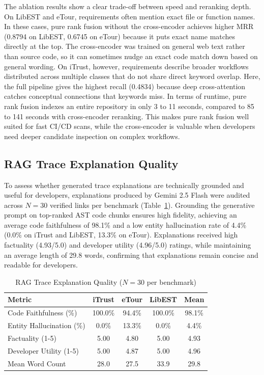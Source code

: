 \documentclass[conference]{IEEEtran}
\renewcommand{\arraystretch}{1.15}
\begin{document}
The ablation results show a clear trade-off between speed and reranking depth. On LibEST and eTour, requirements often mention exact file or function names. In these cases, pure rank fusion without the cross-encoder achieves higher MRR (0.8794 on LibEST, 0.6745 on eTour) because it puts exact name matches directly at the top. The cross-encoder was trained on general web text rather than source code, so it can sometimes nudge an exact code match down based on general wording. On iTrust, however, requirements describe broader workflows distributed across multiple classes that do not share direct keyword overlap. Here, the full pipeline gives the highest recall (0.4834) because deep cross-attention catches conceptual connections that keywords miss. In terms of runtime, pure rank fusion indexes an entire repository in only 3 to 11 seconds, compared to 85 to 141 seconds with cross-encoder reranking. This makes pure rank fusion well suited for fast CI/CD scans, while the cross-encoder is valuable when developers need deeper candidate inspection on complex workflows.

\subsection{RAG Trace Explanation Quality}

To assess whether generated trace explanations are technically grounded and useful for developers, explanations produced by Gemini 2.5 Flash were audited across $N=30$ verified links per benchmark (Table~\ref{tab:explanation_eval}). Grounding the generative prompt on top-ranked AST code chunks ensures high fidelity, achieving an average code faithfulness of 98.1\% and a low entity hallucination rate of 4.4\% (0.0\% on iTrust and LibEST, 13.3\% on eTour). Explanations received high factuality (4.93/5.0) and developer utility (4.96/5.0) ratings, while maintaining an average length of 29.8 words, confirming that explanations remain concise and readable for developers.

\begin{table}[H]
\centering
\caption{RAG Trace Explanation Quality ($N=30$ per benchmark)}
\label{tab:explanation_eval}
\small
\renewcommand{\arraystretch}{1.05}
\begin{tabular}{@{}lcccc@{}}
\toprule
\textbf{Metric} & \textbf{iTrust} & \textbf{eTour} & \textbf{LibEST} & \textbf{Mean} \\
\midrule
Code Faithfulness (\%) & 100.0\% & 94.4\% & 100.0\% & 98.1\% \\
Entity Hallucination (\%) & 0.0\% & 13.3\% & 0.0\% & 4.4\% \\
Factuality (1-5) & 5.00 & 4.80 & 5.00 & 4.93 \\
Developer Utility (1-5) & 5.00 & 4.87 & 5.00 & 4.96 \\
Mean Word Count & 28.0 & 27.5 & 33.9 & 29.8 \\
\bottomrule
\end{tabular}
\end{table}
\end{document}
